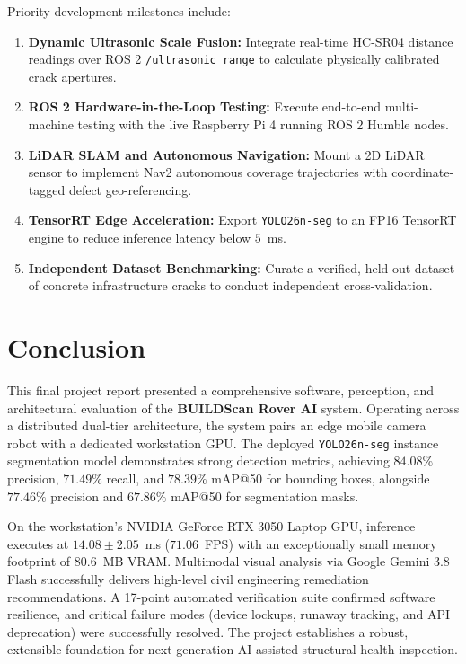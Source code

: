 \documentclass[12pt,a4paper,oneside]{report}
\begin{document}
Priority development milestones include:
\begin{enumerate}
  \item \textbf{Dynamic Ultrasonic Scale Fusion:} Integrate real-time HC-SR04 distance readings over ROS 2 \texttt{/ultrasonic\_range} to calculate physically calibrated crack apertures.
  \item \textbf{ROS 2 Hardware-in-the-Loop Testing:} Execute end-to-end multi-machine testing with the live Raspberry Pi 4 running ROS 2 Humble nodes.
  \item \textbf{LiDAR SLAM and Autonomous Navigation:} Mount a 2D LiDAR sensor to implement Nav2 autonomous coverage trajectories with coordinate-tagged defect geo-referencing.
  \item \textbf{TensorRT Edge Acceleration:} Export \texttt{YOLO26n-seg} to an FP16 TensorRT engine to reduce inference latency below $5$~ms.
  \item \textbf{Independent Dataset Benchmarking:} Curate a verified, held-out dataset of concrete infrastructure cracks to conduct independent cross-validation.
\end{enumerate}


\chapter{Conclusion}
\label{ch:conclusion}
This final project report presented a comprehensive software, perception, and architectural evaluation of the \textbf{BUILDScan Rover AI} system. Operating across a distributed dual-tier architecture, the system pairs an edge mobile camera robot with a dedicated workstation GPU. The deployed \texttt{YOLO26n-seg} instance segmentation model demonstrates strong detection metrics, achieving $84.08\%$ precision, $71.49\%$ recall, and $78.39\%$ mAP@50 for bounding boxes, alongside $77.46\%$ precision and $67.86\%$ mAP@50 for segmentation masks.

On the workstation's NVIDIA GeForce RTX 3050 Laptop GPU, inference executes at $14.08 \pm 2.05$~ms ($71.06$~FPS) with an exceptionally small memory footprint of $80.6$~MB VRAM. Multimodal visual analysis via Google Gemini 3.8 Flash successfully delivers high-level civil engineering remediation recommendations. A 17-point automated verification suite confirmed software resilience, and critical failure modes (device lockups, runaway tracking, and API deprecation) were successfully resolved. The project establishes a robust, extensible foundation for next-generation AI-assisted structural health inspection.
\end{document}
